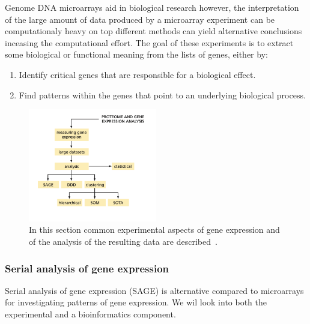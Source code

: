 \documentclass{report}
\begin{document}
Genome DNA microarrays aid in biological research however, the interpretation of the large amount of data produced by a microarray experiment can be computationaly heavy on top different methods can yield alternative conclusions inceasing the computational effort. The goal of these experiments is to extract some biological or functional meaning from the lists of genes, either by:

\begin{enumerate}
    \item Identify critical genes that are responsible for a biological effect.
    \item Find patterns within the genes that point to an underlying biological process.
\end{enumerate}
\cite{zvelebil_understanding_2008}

\begin{figure}[H]
    \centering
    \includegraphics[width=0.5\textwidth]{Gene Expresion.png}
    \caption{\label{fig:Gene Expression}In this section common experimental aspects of gene expression and of the analysis of the resulting data are described~\cite{zvelebil_understanding_2008}.}
\end{figure}

\subsubsection{Serial analysis of gene expression}

Serial analysis of gene expression (SAGE) is alternative compared to microarrays for investigating patterns of gene expression.
We wil look into both the experimental and a bioinformatics component.
\end{document}

